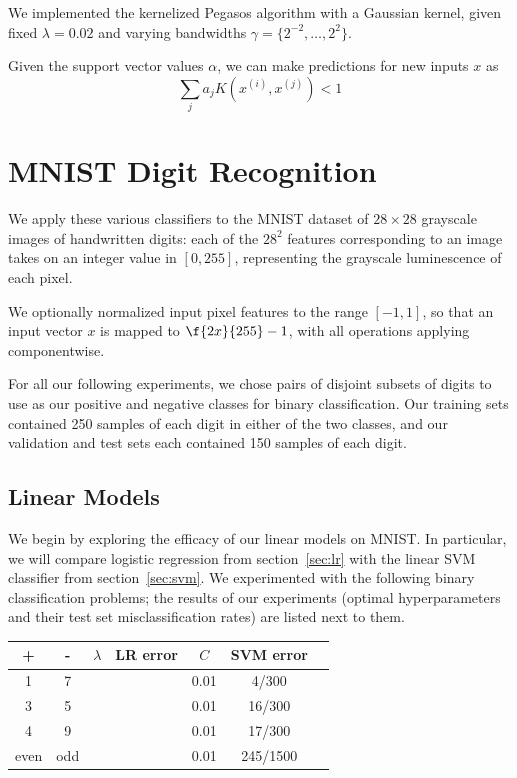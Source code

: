 \documentclass{article}
\begin{document}
\begin{multicols}{2}
We implemented the kernelized Pegasos algorithm with a Gaussian kernel, given fixed $\lambda = 0.02$ and varying bandwidths $\gamma = \{2^{-2},\dots,2^2\}$.

Given the support vector values $\alpha$, we can make predictions for new inputs $x$ as 
\begin{equation}
    \sum_j{a_j K(x^{(i)},x^{(j)}) < 1 }
\end{equation}


\section{MNIST Digit Recognition}

We apply these various classifiers to the MNIST dataset
of $28\times 28$ grayscale images of handwritten digits:
each of the $28^2$ features corresponding to an image takes on an integer value in $[0, 255]$,
representing the grayscale luminescence of each pixel.

We optionally normalized input pixel features to the range $[-1, 1]$,
so that an input vector $x$ is mapped to $\f{2x}{255}-1$,
with all operations applying componentwise.

For all our following experiments,
we chose pairs of disjoint subsets of digits
to use as our positive and negative classes for binary classification.
Our training sets contained 250 samples of each digit in either of the two classes,
and our validation and test sets each contained 150 samples of each digit.

\subsection{Linear Models}

We begin by exploring the efficacy of our linear models on MNIST.
In particular, we will compare logistic regression from section~\ref{sec:lr}
with the linear SVM classifier from section~\ref{sec:svm}.
We experimented with the following binary classification problems;
the results of our experiments
(optimal hyperparameters and their test set misclassification rates)
are listed next to them.
\begin{center}
\begin{tabular}{|c|c||c|c||c|c|c|}
\hline
+ & - & $\lambda$ & LR error & $C$ & SVM error \\\hline
1 & 7 & & & 0.01 & 4/300 \\
3 & 5 & & & 0.01 & 16/300 \\
4 & 9 & & & 0.01 & 17/300\\
even & odd & & & 0.01 & 245/1500\\\hline
\end{tabular}
\end{center}



\end{multicols}
\end{document}

